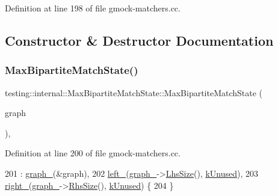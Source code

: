 Definition at line 198 of file gmock-\/matchers.\+cc.



\subsection{Constructor \& Destructor Documentation}
\mbox{\label{classtesting_1_1internal_1_1MaxBipartiteMatchState_a9d0166d5cc7afd1b741f6c312df72b54}} 
\subsubsection{\texorpdfstring{Max\+Bipartite\+Match\+State()}{MaxBipartiteMatchState()}}
{\footnotesize\ttfamily testing\+::internal\+::\+Max\+Bipartite\+Match\+State\+::\+Max\+Bipartite\+Match\+State (\begin{DoxyParamCaption}\item[{const \hyperlink{classtesting_1_1internal_1_1MatchMatrix}{Match\+Matrix} \&}]{graph }\end{DoxyParamCaption})\hspace{0.3cm}{\ttfamily [inline]}, {\ttfamily [explicit]}}



Definition at line 200 of file gmock-\/matchers.\+cc.


\begin{DoxyCode}
201       : \hyperlink{classtesting_1_1internal_1_1MaxBipartiteMatchState_aba20adc38680caf7db98321cfde24dec}{graph\_}(&graph),
202         \hyperlink{classtesting_1_1internal_1_1MaxBipartiteMatchState_af63f4d7546e914a13b43f30e63f27b6f}{left\_}(\hyperlink{classtesting_1_1internal_1_1MaxBipartiteMatchState_aba20adc38680caf7db98321cfde24dec}{graph\_}->\hyperlink{classtesting_1_1internal_1_1MatchMatrix_a337d9793c61d985dbc1be166e34eed61}{LhsSize}(), \hyperlink{classtesting_1_1internal_1_1MaxBipartiteMatchState_a628d16d346432c1556097b94fad27e42}{kUnused}),
203         \hyperlink{classtesting_1_1internal_1_1MaxBipartiteMatchState_a85c29e270fd44f16458cf48cdc06d19a}{right\_}(\hyperlink{classtesting_1_1internal_1_1MaxBipartiteMatchState_aba20adc38680caf7db98321cfde24dec}{graph\_}->\hyperlink{classtesting_1_1internal_1_1MatchMatrix_aff068e9fed3a42466c5da8766ac43134}{RhsSize}(), \hyperlink{classtesting_1_1internal_1_1MaxBipartiteMatchState_a628d16d346432c1556097b94fad27e42}{kUnused}) \{
204   \}
\end{DoxyCode}


